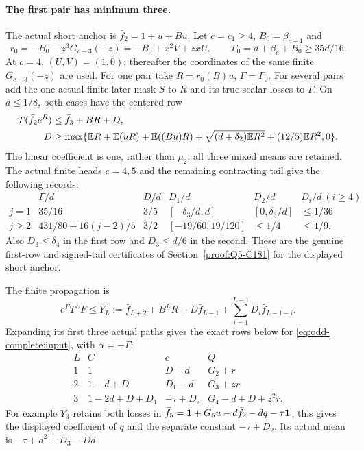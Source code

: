 \paragraph{The first pair has minimum three.}
The actual short anchor is $\bar f_2=1+u+Bu$.
Let $c=c_1\ge4$, $B_0=\beta_{c-1}$ and
\[
 r_0=-B_0-z^3G_{c-3}(-z)=-B_0+x^2V+zxU,
 \qquad\Gamma_0=d+\beta_c+B_0\ge35d/16.
\]
At $c=4$, $(U,V)=(1,0)$; thereafter the coordinates of the
same finite $G_{c-3}(-z)$ are used. For one pair take $R=r_0(B)u$,
$\Gamma=\Gamma_0$. For several pairs add the one actual finite
later mask $S$ to $R$ and its true scalar losses to $\Gamma$.
On $d\le1/8$, both cases have the centered row
\begin{equation}\label{eq:odd-anchor:short-first}
\begin{aligned}
 T(\bar f_2e^R)&\le\bar f_3+BR+D,\\
 D&\ge\max\{\mathbb E R+\mathbb E(uR)+\mathbb E((Bu)R)
          +\sqrt{(d+\delta_2)\mathbb E R^2}+(12/5)\mathbb E R^2,0\}.
\end{aligned}
\end{equation}
The linear coefficient is one, rather than $\mu_2$; all three
mixed means are retained. The actual finite heads $c=4,5$ and
the remaining contracting tail give the following records:
\[
\begin{array}{c|c|c|c|c|c}
 &\Gamma/d&D/d&D_1/d&D_2/d&D_i/d\ (i\ge4)\\\hline
 j=1&35/16&3/5&[-\delta_3/d,d]&[0,\delta_3/d]&\le1/36\\
 j\ge2&431/80+16(j-2)/5&3/2&[-19/60,19/120]&\le1/4&\le1/9.
\end{array}
\]
Also $D_3\le\delta_4$ in the first row and $D_3\le d/6$ in
the second. These are the genuine first-row and signed-tail
certificates of Section~\ref{proof:Q5-C181} for the displayed
short anchor.

The finite propagation is
\begin{equation}\label{eq:odd-anchor:short-finite}
 e^\Gamma T^LF\le Y_L:=\bar f_{L+2}+B^LR+D\bar f_{L-1}
                  +\sum_{i=1}^{L-1}D_i\bar f_{L-1-i}.
\end{equation}
Expanding its first three actual paths gives the exact rows
below for \eqref{eq:odd-complete:input}, with $\alpha=-\Gamma$:
\begin{equation}\label{eq:odd-anchor:short-rows}
\begin{array}{c|c|c|c}
 L&C&c&Q\\\hline
 1&1&D-d&G_2+r\\
 2&1-d+D&D_1-d&G_3+zr\\
 3&1-2d+D+D_1&-\tau+D_2&G_4-d+D+z^2r.
\end{array}
\end{equation}
For example $Y_3$ retains both losses in
$\bar f_5=\mathbf1+G_5u-d\bar f_2-dq-\tau\mathbf1$; this gives
the displayed coefficient of $q$ and the separate constant
$-\tau+D_2$. Its actual mean is
$-\tau+d^2+D_3-Dd$.

